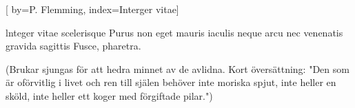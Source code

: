 [
by={P. Flemming},
index={Interger vitae}]

\beginverse*	
lnteger vitae scelerisque Purus
non eget mauris iaculis neque arcu
nec venenatis
gravida sagittis
Fusce, pharetra.
\endverse

\beginverse* 
(Brukar sjungas för att hedra minnet av de avlidna. Kort 
översättning: "Den som är oförvitlig i livet och ren till själen 
behöver inte moriska spjut, inte heller en sköld, inte heller 
ett koger med förgiftade pilar.")
\endverse
\endsong


